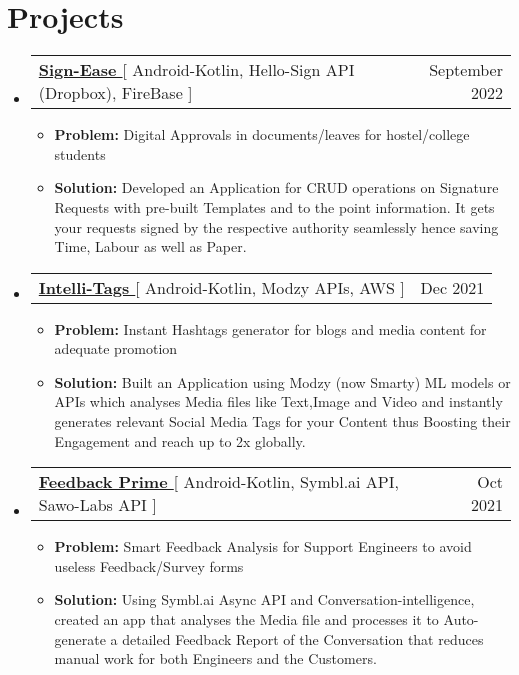 \documentclass[letterpaper,11pt]{article}
\makeatletter
\newcommand{\resumeItem}[1]{
  \item\small{
    {#1 \vspace{-2pt}}
  }
}
\newcommand{\resumeProjectHeading}[2]{
    \item
    \begin{tabular*}{0.97\textwidth}{l@{\extracolsep{\fill}}r}
      \small#1 & #2 \\
    \end{tabular*}\vspace{-7pt}
}
\newcommand{\resumeSubHeadingListStart}{\begin{itemize}[leftmargin=0.15in, label={}]}
\newcommand{\resumeSubHeadingListEnd}{\end{itemize}}
\newcommand{\resumeItemListStart}{\begin{itemize}}
\newcommand{\resumeItemListEnd}{\end{itemize}\vspace{-5pt}}
\makeatother
\begin{document}
\section{Projects}

 \resumeSubHeadingListStart
      \resumeProjectHeading
          {\textbf{\href{https://github.com/itsnitish22/Sign-Ease}{Sign-Ease }}{[ Android-Kotlin, Hello-Sign API (Dropbox), FireBase ]}}{September 2022}
          \resumeItemListStart
          \resumeItem{\textbf{Problem:} Digital Approvals in documents/leaves for hostel/college students}
          \resumeItem{\textbf{Solution:} Developed an Application for CRUD operations on Signature Requests with pre-built Templates and to the point information. It gets your requests signed by the respective authority seamlessly hence saving Time, Labour as well as Paper.}
          \resumeItemListEnd
    \resumeSubHeadingListEnd
    
 \resumeSubHeadingListStart
      \resumeProjectHeading
          {\textbf{\href{https://github.com/aniketk13/Intelli-Tags}{Intelli-Tags }}{[ Android-Kotlin, Modzy APIs, AWS ]}}{Dec 2021}
          \resumeItemListStart
          \resumeItem{\textbf{Problem:} Instant Hashtags generator for blogs and media content for adequate promotion}
          \resumeItem{\textbf{Solution:} Built an Application using Modzy (now Smarty) ML models or APIs which analyses Media files like Text,Image and Video and instantly generates relevant Social Media Tags for your Content thus Boosting their Engagement and reach up to 2x globally.}
          \resumeItemListEnd
    \resumeSubHeadingListEnd
    
    \resumeSubHeadingListStart
      \resumeProjectHeading
          {\textbf{\href{https://github.com/aniketk13/Feedback-Prime}{Feedback Prime }}{[ Android-Kotlin, Symbl.ai API, Sawo-Labs API ]}}{Oct 2021}
          \resumeItemListStart
           \resumeItem{\textbf{Problem:} Smart Feedback Analysis for Support Engineers to avoid useless Feedback/Survey forms}
           \resumeItem{\textbf{Solution:} Using Symbl.ai Async API and Conversation-intelligence, created an app that analyses the Media file and processes it to Auto-generate a detailed Feedback Report of the Conversation that reduces manual work for both Engineers and the Customers.}
          \resumeItemListEnd
    \resumeSubHeadingListEnd
    
   
    




%
\end{document}
